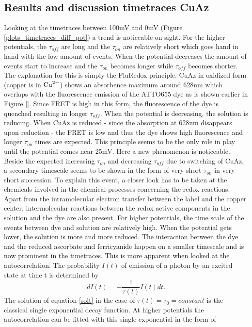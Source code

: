 \documentclass[twoside,single]{lion-msc}
\begin{document}
\subsection*{Results and discussion timetraces CuAz}

Looking at the timetraces between 100mV and 0mV (Figure \ref{plots_timetraces_diff_pot}) a trend is noticeable on sight. For the higher potentials, the $\tau_{off}$ are long and the $\tau_{on}$ are relatively short which goes hand in hand with the low amount of events. When the potential decreases the amount of events start to increase and the $\tau_{on}$ becomes longer while $\tau_{off}$ becomes shorter. The explanation for this is simply the FluRedox principle. CuAz in oxidized form (copper is in $\textup{Cu}^{2+}$) shows an absorbence maximum around 628nm which overlaps with the fluorescence emission of the ATTO655 dye as is shown earlier in Figure \ref{}. Since FRET is high in this form, the fluorescence of the dye is quenched resulting in longer $\tau_{off}$. When the potential is decreasing, the solution is reducing. When CuAz is reduced - since the absorption at 628nm disappears upon reduction - the FRET is low and thus the dye  shows high fluorescence and longer $\tau_{on}$ times are expected. This principle seems to be the only role in play until the potential comes near 25mV. Here a new phenomenon is noticeable. Beside the expected  increasing $\tau_{on}$ and decreasing $\tau_{off}$ due to switching of CuAz, a secondary timescale seems to be shown in the form of very short $\tau_{on}$ in very short succession. To explain this event, a closer look has to be taken at the chemicals involved in the chemical processes concerning the redox reactions. Apart from the intramolecular electron transfer between the label and the copper center, intermolecular reactions between the redox active components in the solution and the dye are also present. For higher potentials, the time scale of the events between dye and solution are relatively high. When the potential gets lower, the solution is more and more reduced. The interaction between the dye and the reduced ascorbate and ferricyanide happen on a smaller timescale and is now prominent in the timetraces. This is more apparent when looked at the autocorrelation. The probability $I(t)$ of emission of a photon by an excited state at time t is determined by
\begin{equation} \label{solt}
dI(t) = -\frac{1}{\tau(t)}I(t)dt.
\end{equation}
The solution of equation \ref{solt} in the case of $\tau(t) = \tau_{0}= constant$ is the classical single exponential decay function. At higher potentials the autocorrelation can be fitted with this single exponential in the form of
\end{document}
